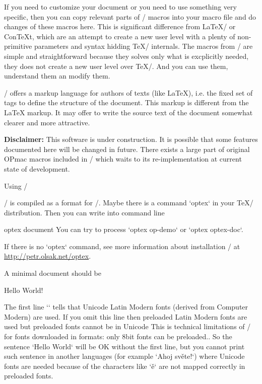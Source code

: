 If you need to customize your document or you need to use something
very specific, then you can copy relevant parts of \OpTeX/ macros into your macro
file and do changes of these macros here. This is significant difference from
\LaTeX/ or ConTeXt, which are an attempt to create a new user level with a
plenty of non-primitive parameters and syntax hidding \TeX/ internals.
The macros from \OpTeX/ are simple and straightforward because they solves only
what is excplicitly needed, they does not create a new user level over \TeX/.
And you can use them, understand them an modify them.

\OpTeX/ offers a markup language for authors of texts (like \LaTeX),
i.e. the fixed set of tags to define the structure of the document. This
markup is different from the \LaTeX{} markup. It may offer to write the
source text of the document somewhat clearer and more attractive. 

\new 
{\bf Disclaimer:} This software is under construction. It is possible
that some features documented here will be changed in future. There exists a
large part of original OPmac macros included in \OpTeX/ which waits to its
re-implementation at current state of development.


\sec Using \OpTeX/

\new
\OpTeX/ is compiled as a format for \LuaTeX/. Maybe there is a command
`optex` in your \TeX/ distribution. Then you can write into command line

\begtt
optex document
\endtt
%
You can try to process `optex op-demo` or `optex optex-doc`.

If there is no `optex` command, see more information about installation
\OpTeX/ at \url{http://petr.olsak.net/optex}. 

A minimal document should be

\begtt
\fontfam[LMfonts]
Hello World! \bye
\endtt

The first line `\fontfam[LMfonts]` tells that Unicode Latin Modern 
fonts (derived from Computer Modern) are used. If you omit this line then
preloaded Latin Modern fonts are used but preloaded fonts cannot be in
Unicode\fnote
{This is technical limitations of \LuaTeX/ for fonts downloaded in formats:
only 8bit fonts can be preloaded.}.
So the sentence `Hello World` will be OK without the first line, but you 
cannot print such sentence in another languages (for example `Ahoj světe!`) 
where Unicode fonts are needed
because of the characters like `ě` are not mapped correctly in preloaded
fonts.

